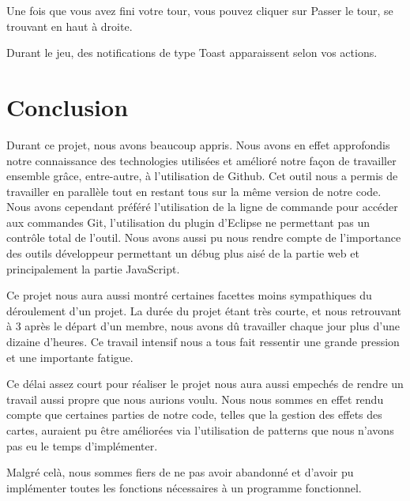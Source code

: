\documentclass[11pt]{scrreprt}
\begin{document}
    Une fois que vous avez fini votre tour, vous pouvez cliquer sur \og Passer le tour\fg{}, se trouvant en haut à droite.

    Durant le jeu, des notifications de type Toast apparaissent selon vos actions.

    \chapter{Conclusion}
    Durant ce projet, nous avons beaucoup appris. Nous avons en effet approfondis notre connaissance des technologies utilisées et amélioré notre façon de travailler ensemble grâce, entre-autre, à l'utilisation de Github. Cet outil nous a permis de travailler en parallèle tout en restant tous sur la même version de notre code. Nous avons cependant préféré l'utilisation de la ligne de commande pour accéder aux commandes Git, l'utilisation du plugin d'Eclipse ne permettant pas un contrôle total de l'outil. Nous avons aussi pu nous rendre compte de l'importance des \og outils développeur\fg{} permettant un débug plus aisé de la partie web et principalement la partie JavaScript.

    Ce projet nous aura aussi montré certaines facettes moins sympathiques du déroulement d'un projet. La durée du projet étant très courte, et nous retrouvant à 3 après le départ d'un membre, nous avons dû travailler chaque jour plus d'une dizaine d'heures. Ce travail intensif nous a tous fait ressentir une grande pression et une importante fatigue.

    Ce délai assez court pour réaliser le projet nous aura aussi empechés de rendre un travail aussi propre que nous aurions voulu. Nous nous sommes en effet rendu compte que certaines parties de notre code, telles que la gestion des effets des cartes, auraient pu être améliorées via l'utilisation de patterns que nous n'avons pas eu le temps d'implémenter.

    Malgré celà, nous sommes fiers de ne pas avoir abandonné et d'avoir pu implémenter toutes les fonctions nécessaires à un programme fonctionnel.
\end{document}

